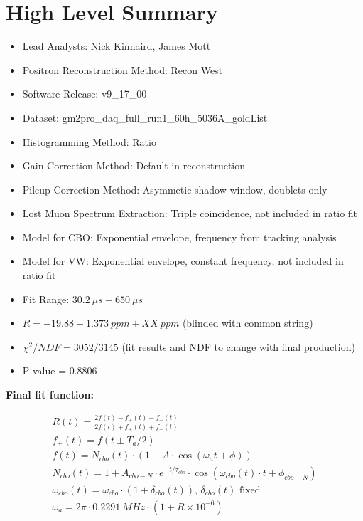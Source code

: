 \chapter*{High Level Summary}

\vspace{5mm}

\begin{itemize}
	\item{Lead Analysts: Nick Kinnaird, James Mott}
	\item{Positron Reconstruction Method: Recon West}
	\item{Software Release: v9\_17\_00}
	\item{Dataset: gm2pro\_daq\_full\_run1\_60h\_5036A\_goldList}
	\item{Histogramming Method: Ratio}
	\item{Gain Correction Method: Default in reconstruction}
	\item{Pileup Correction Method: Asymmetic shadow window, doublets only}
	\item{Lost Muon Spectrum Extraction: Triple coincidence, not included in ratio fit}
	\item{Model for CBO: Exponential envelope, frequency from tracking analysis}
	\item{Model for VW: Exponential envelope, constant frequency, not included in ratio fit}
	\item{Fit Range: $\SI{30.2}{\mu s} - \SI{650}{\mu s}$}
	\item{$R = -19.88 \pm \SI{1.373}{ppm} \pm XX\SI{}{ppm}$ (blinded with common string)}
	\item{$\chi^{2}/NDF = 3052/3145$} (fit results and NDF to change with final production)
	\item{P value = 0.8806}
\end{itemize}

\textbf{Final fit function:}

\begin{gather*}
		R(t) = \frac{2f(t) - f_{+}(t) - f_{-}(t)}{2f(t) + f_{+}(t) + f_{-}(t)} \\[6pt]
		f_{\pm}(t) = f(t \pm T_{a}/2) \\[6pt]
		f(t) = N_{cbo}(t) \cdot (1 + A \cdot \cos(\omega_{a}t + \phi)) \\[6pt]
		N_{cbo}(t) = 1 + A_{cbo-N} \cdot e^{-t/\tau_{cbo}} \cdot \cos(\omega_{cbo}(t) \cdot t + \phi_{cbo-N}) \\[6pt]
		\omega_{cbo}(t) = \omega_{cbo} \cdot (1 + \delta_{cbo}(t)) \text{, $\delta_{cbo}(t)$ fixed} \\[6pt]
		\omega_{a} = 2 \pi \cdot \SI{0.2291}{MHz} \cdot (1 + R \times 10^{-6})
\end{gather*}

